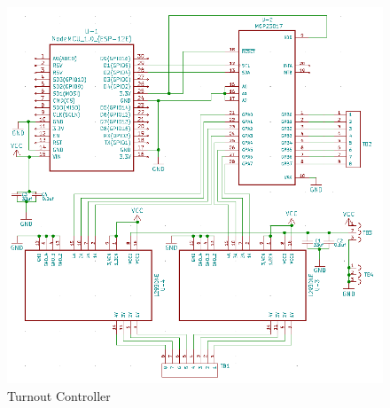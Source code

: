 \begin{figure}[htbp]
    \centering
    \includegraphics[scale=0.4]{../Images/turnout_schematic.png}
    \caption{Turnout Controller}
    \label{fig:turnout-controller}
\end{figure}

